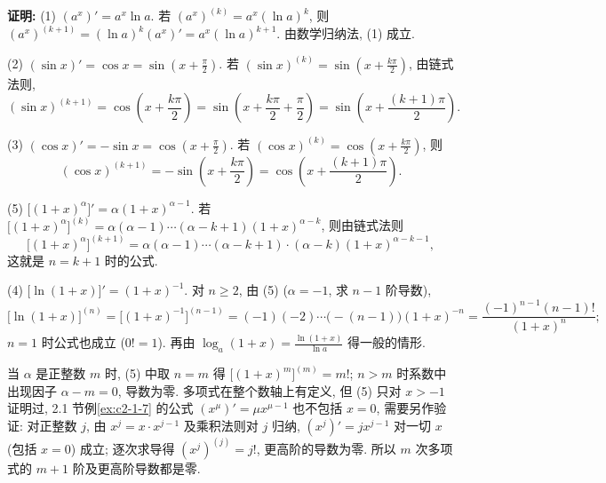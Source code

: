 \documentclass[UTF8,openany]{ctexbook}
\theoremstyle{chinesetextbook}
\newenvironment{cnproof}{\par\indent\textbf{证明:} \ignorespaces}{\par}
\begin{document}
\begin{cnproof}
(1) $(a^x)'=a^x\ln a$. 若 $(a^x)^{(k)}=a^x(\ln a)^k$, 则 $(a^x)^{(k+1)}=(\ln a)^k(a^x)'=a^x(\ln a)^{k+1}$. 由数学归纳法, (1) 成立.

(2) $\displaystyle(\sin x)'=\cos x=\sin\left(x+\frac\pi2\right)$. 若 $\displaystyle(\sin x)^{(k)}=\sin\left(x+\frac{k\pi}2\right)$, 由链式法则,
\[
(\sin x)^{(k+1)}=\cos\left(x+\frac{k\pi}2\right)=\sin\left(x+\frac{k\pi}2+\frac\pi2\right)=\sin\left(x+\frac{(k+1)\pi}2\right).
\]

(3) $\displaystyle(\cos x)'=-\sin x=\cos\left(x+\frac\pi2\right)$. 若 $\displaystyle(\cos x)^{(k)}=\cos\left(x+\frac{k\pi}2\right)$, 则
\[
(\cos x)^{(k+1)}=-\sin\left(x+\frac{k\pi}2\right)=\cos\left(x+\frac{(k+1)\pi}2\right).
\]

(5) $\bigl[(1+x)^\alpha\bigr]'=\alpha(1+x)^{\alpha-1}$. 若 $\bigl[(1+x)^\alpha\bigr]^{(k)}=\alpha(\alpha-1)\cdots(\alpha-k+1)(1+x)^{\alpha-k}$, 则由链式法则
\[
\bigl[(1+x)^\alpha\bigr]^{(k+1)}=\alpha(\alpha-1)\cdots(\alpha-k+1)\cdot(\alpha-k)(1+x)^{\alpha-k-1},
\]
这就是 $n=k+1$ 时的公式.

(4) $\displaystyle\bigl[\ln(1+x)\bigr]'=(1+x)^{-1}$. 对 $n\ge2$, 由 (5) ($\alpha=-1$, 求 $n-1$ 阶导数),
\[
\bigl[\ln(1+x)\bigr]^{(n)}=\bigl[(1+x)^{-1}\bigr]^{(n-1)}=(-1)(-2)\cdots\bigl(-(n-1)\bigr)(1+x)^{-n}=\frac{(-1)^{n-1}(n-1)!}{(1+x)^n};
\]
$n=1$ 时公式也成立 ($0!=1$). 再由 $\displaystyle\log_a(1+x)=\frac{\ln(1+x)}{\ln a}$ 得一般的情形.
\end{cnproof}
当 $\alpha$ 是正整数 $m$ 时, (5) 中取 $n=m$ 得 $\bigl[(1+x)^m\bigr]^{(m)}=m!$; $n>m$ 时系数中出现因子 $\alpha-m=0$, 导数为零. 多项式在整个数轴上有定义, 但 (5) 只对 $x>-1$ 证明过, 2.1 节例\ref{ex:c2-1-7} 的公式 $(x^\mu)'=\mu x^{\mu-1}$ 也不包括 $x=0$, 需要另作验证: 对正整数 $j$, 由 $x^j=x\cdot x^{j-1}$ 及乘积法则对 $j$ 归纳, $(x^j)'=jx^{j-1}$ 对一切 $x$ (包括 $x=0$) 成立; 逐次求导得 $(x^j)^{(j)}=j!$, 更高阶的导数为零. 所以 $m$ 次多项式的 $m+1$ 阶及更高阶导数都是零.
\end{document}
